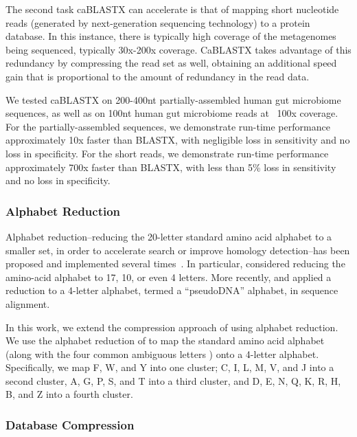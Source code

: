 \documentclass{amsbook}
\theoremstyle{definition}
\theoremstyle{remark}
\numberwithin{equation}{section}
\begin{document}
The second task caBLASTX can accelerate is that of mapping short nucleotide
reads (generated by next-generation sequencing technology) to a protein
database. In this instance, there is typically high coverage of the metagenomes
being sequenced, typically 30x-200x coverage. CaBLASTX takes advantage of this
redundancy
by compressing the read set as well, obtaining an additional speed gain that is
proportional to the amount of redundancy in the read data.


We tested caBLASTX on 200-400nt partially-assembled human gut microbiome
sequences, as well as on 100nt human gut microbiome reads at ~100x coverage.
For the partially-assembled sequences, we demonstrate run-time performance
approximately 10x faster than BLASTX, with negligible loss in sensitivity and
no loss in specificity. For the short reads, we demonstrate run-time
performance approximately 700x faster than BLASTX, with less than 5\% loss in
sensitivity and no loss in specificity.

\subsubsection*{Alphabet Reduction}

Alphabet reduction--reducing the 20-letter standard amino acid alphabet to a
smaller set, in order to accelerate search or improve homology detection--has
been proposed and implemented several times~\cite{blah}.
In particular, \citet{Murphy:2000, Peterson:2009} considered reducing the
amino-acid alphabet to 17, 10, or even 4 letters.
More recently, \citet{Zhao:2012} and \citet{Huson:2013} applied a reduction to
a 4-letter alphabet, termed a ``pseudoDNA'' alphabet, in sequence alignment.

In this work, we extend the compression approach of \citet{Daniels:2013} using
alphabet reduction.
We use the alphabet reduction of \citet{Murphy:2000} to map the standard amino
acid alphabet (along with the four common ambiguous letters ) onto a 4-letter 
alphabet.
Specifically, we map F, W, and Y into one cluster; C, I, L, M, V, and J into
a second cluster, A, G, P, S, and T into a third cluster, and
D, E, N, Q, K, R, H, B, and Z into a fourth cluster.

\subsubsection*{Database Compression}
\end{document}
